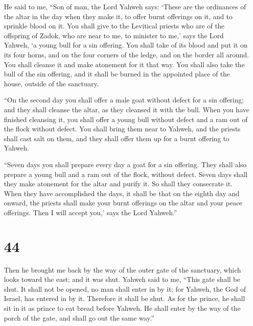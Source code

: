  He said to me, ``Son of man, the Lord Yahweh says:
`These are the ordinances of the altar in the day when they make it, to
offer burnt offerings on it, and to sprinkle blood on it.
 You shall give to the Levitical priests who are of the
offspring of Zadok, who are near to me, to minister to me,' says the
Lord Yahweh, `a young bull for a sin offering.  You shall
take of its blood and put it on its four horns, and on the four corners
of the ledge, and on the border all around. You shall cleanse it and
make atonement for it that way.  You shall also take the
bull of the sin offering, and it shall be burned in the appointed place
of the house, outside of the sanctuary.

 ``On the second day you shall offer a male goat without
defect for a sin offering; and they shall cleanse the altar, as they
cleansed it with the bull.  When you have finished
cleansing it, you shall offer a young bull without defect and a ram out
of the flock without defect.  You shall bring them near
to Yahweh, and the priests shall cast salt on them, and they shall offer
them up for a burnt offering to Yahweh.

 ``Seven days you shall prepare every day a goat for a
sin offering. They shall also prepare a young bull and a ram out of the
flock, without defect.  Seven days shall they make
atonement for the altar and purify it. So shall they consecrate it.
 When they have accomplished the days, it shall be that
on the eighth day and onward, the priests shall make your burnt
offerings on the altar and your peace offerings. Then I will accept
you,' says the Lord Yahweh.''

\hypertarget{section-43}{%
\section{44}\label{section-43}}

 Then he brought me back by the way of the outer gate of
the sanctuary, which looks toward the east; and it was shut.
 Yahweh said to me, ``This gate shall be shut. It shall
not be opened, no man shall enter in by it; for Yahweh, the God of
Israel, has entered in by it. Therefore it shall be shut. 
As for the prince, he shall sit in it as prince to eat bread before
Yahweh. He shall enter by the way of the porch of the gate, and shall go
out the same way.''

